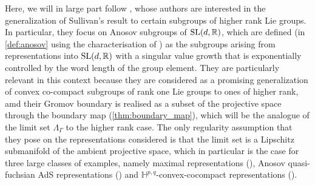\documentclass{report}
\begin{document}
Here, we will in large part follow \cite{pozzetti_anosov_2023}, whose authors are interested in the generalization of Sullivan's result to certain subgroups of higher rank Lie groups.
In particular, they focus on Anosov subgroups of $\operatorname{{\mathrm{SL}}}(d, \mathbb R)$, which are 
defined (in \cref{def:anosov} using the characterisation of \cite{kapovich2017anosov}) as the subgroups arising from representations into $\operatorname{{\mathrm{SL}}}(d, \mathbb R)$ with a singular value growth that is exponentially controlled by the word length of the group element.
They are particularly relevant in this context because they are considered as a promising generalization of convex co-compact subgroups of rank one Lie groups to ones of higher rank,
amd their Gromov boundary is realised as a subset of the projective space through the boundary map (\cref{thm:boundary_map}), which will be the analogue of the limit set $\Lambda_\Gamma$ to the higher rank case.
The only regularity assumption that they pose on the representations considered is that the limit set is a Lipschitz submanifold of the ambient projective space, which in particular is the case for three large classes of examples, namely maximal representations (\cite{burger2010surface}), Anosov quasi-fuchsian AdS representations (\cite{merigot2012anosov}) and $\mathbb H^{p,q}$-convex-cocompact representations (\cite{danciger2018convex}).
\end{document}
